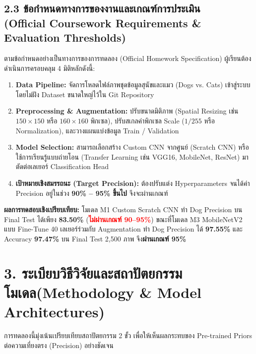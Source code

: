 \documentclass[12pt,a4paper]{article}
\begin{document}
\subsection*{2.3 ข้อกำหนดทางการของงานและเกณฑ์การประเมิน\\ \normalsize(Official Coursework Requirements \& Evaluation Thresholds)}
ตามข้อกำหนดอย่างเป็นทางการของการทดลอง (Official Homework Specification) ผู้เรียนต้องดำเนินการครอบคลุม 4 มิติหลักดังนี้:
\begin{enumerate}[leftmargin=1.8em, itemsep=0pt, topsep=1pt, parsep=0pt]
\item \textbf{Data Pipeline:} จัดการโหลดไฟล์ภาพชุดข้อมูลสุนัขและแมว (Dogs vs. Cats) เข้าสู่ระบบ โดยไม่ฝัง Dataset ขนาดใหญ่ไว้ใน Git Repository
\item \textbf{Preprocessing \& Augmentation:} ปรับขนาดมิติภาพ (Spatial Resizing เช่น $150 \times 150$ หรือ $160 \times 160$ พิกเซล), ปรับสเกลค่าพิกเซล Scale ($1/255$ หรือ Normalization), และวางแผนแบ่งข้อมูล Train / Validation
\item \textbf{Model Selection:} สามารถเลือกสร้าง Custom CNN จากศูนย์ (Scratch CNN) หรือใช้การเรียนรู้แบบถ่ายโอน (Transfer Learning เช่น VGG16, MobileNet, ResNet) มาตัดต่อเลเยอร์ Classification Head
\item \textbf{เป้าหมายเชิงสมรรถนะ (Target Precision):} ต้องปรับแต่ง Hyperparameters จนได้ค่า Precision อยู่ในช่วง \textbf{90\% -- 95\% ขึ้นไป} จึงจะผ่านเกณฑ์
\end{enumerate}
\vspace{2pt}
\noindent\textbf{ผลการทดสอบเชิงเปรียบเทียบ:} โมเดล M1 Custom Scratch CNN ทำ Dog Precision บน Final Test ได้เพียง \textbf{83.50\%} (\textcolor{red}{\textbf{ไม่ผ่านเกณฑ์ 90--95\%}}) ขณะที่โมเดล M3 MobileNetV2 แบบ Fine-Tune 40 เลเยอร์ร่วมกับ Augmentation ทำ Dog Precision ได้ \textbf{97.55\%} และ Accuracy \textbf{97.47\%} บน Final Test 2,500 ภาพ จึง\textcolor{accentblue}{\textbf{ผ่านเกณฑ์ 95\%}}

\vspace{1em}
\clearpage
\section*{3. ระเบียบวิธีวิจัยและสถาปัตยกรรมโมเดล\newline \large(Methodology \& Model Architectures)}

การทดลองนี้มุ่งเน้นเปรียบเทียบสถาปัตยกรรม 2 ขั้ว เพื่อให้เห็นผลกระทบของ Pre-trained Priors ต่อความเที่ยงตรง (Precision) อย่างชัดเจน
\end{document}
